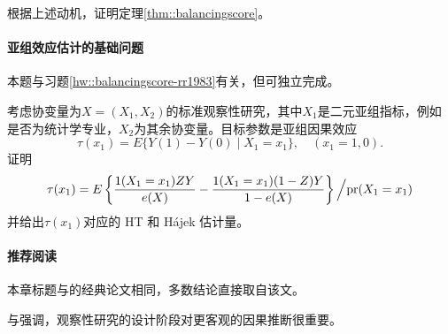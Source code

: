 根据上述动机，证明定理\ref{thm::balancingscore}。 


\paragraph{亚组效应估计的基础问题}

本题与习题\ref{hw::balancingscore-rr1983}有关，但可独立完成。 

考虑协变量为$X = (X_1, X_2)$的标准观察性研究，其中$X_1$是二元亚组指标，例如是否为统计学专业，$X_2$为其余协变量。目标参数是亚组因果效应
$$
\tau(x_1) = E\{ Y(1) - Y(0) \mid X_1 = x_1  \},\quad (x_1=1,0).
$$
证明
$$
\tau(x_1) =  E\left\{   \frac{  1(X_1 = x_1) ZY}{ e(X) }   - \frac{  1(X_1 = x_1) (1-Z)Y}{ 1 -  e(X) }    \right\} \Big /  \textup{pr}(X_1 = x_1)
$$
并给出$\tau(x_1) $对应的 HT 和 Hájek 估计量。 



 \paragraph{推荐阅读}
 
 
本章标题与\citet{rosenbaum1983central}的经典论文相同，多数结论直接取自该文。  


\citet{rubin2007design}与\citet{rubin2008objective}强调，观察性研究的设计阶段对更客观的因果推断很重要。 
 
